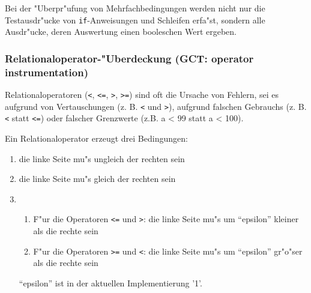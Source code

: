 Bei der "Uberpr"ufung von Mehrfachbedingungen werden nicht nur die
Testausdr"ucke von {\tt {if}}-Anweisungen und Schleifen erfa"st, sondern
alle Ausdr"ucke, deren Auswertung einen booleschen Wert ergeben.


\subsubsection*{Relationaloperator-"Uberdeckung (GCT: operator instrumentation)}

Relationaloperatoren ({\tt {<}}, {\tt {<=}}, {\tt {>}}, {\tt {>=}}) sind oft
die Ursache von Fehlern, sei es aufgrund von Vertauschungen (z. B.
{\tt {<}} und {\tt {>}}), aufgrund falschen Gebrauchs (z. B. {\tt {<}}
statt {\tt {<=}}) oder falscher Grenzwerte (z.B. a < 99 statt a < 100).

Ein Relationaloperator erzeugt drei Bedingungen:

\begin{enumerate}

\item die linke Seite mu"s ungleich der rechten sein

\item die linke Seite mu"s gleich der rechten sein

\item 
	\begin{enumerate}
		\item F"ur die Operatoren {\tt {<=}} und {\tt {>}}:
			die linke Seite mu"s um "`epsilon"' kleiner als die rechte sein
		\item F"ur die Operatoren {\tt {>=}} und {\tt {<}}:
			die linke Seite mu"s um "`epsilon"' gr"o"ser als die rechte sein
	\end{enumerate}
	"`epsilon"' ist in der aktuellen Implementierung '1'.
\end{enumerate}

